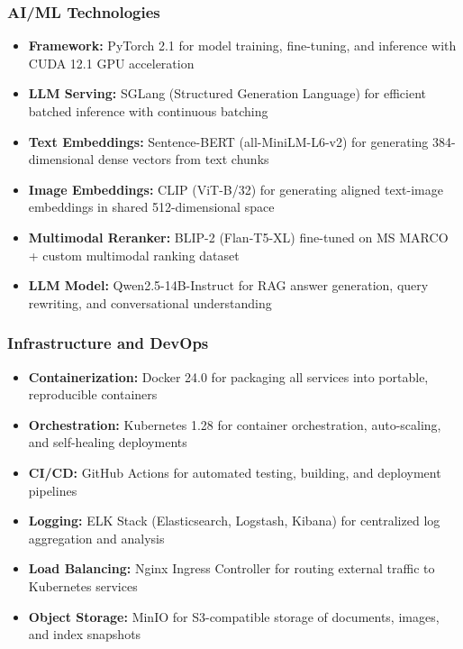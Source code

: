 \subsubsection{AI/ML Technologies}
\begin{itemize}
    \item \textbf{Framework:} PyTorch 2.1 for model training, fine-tuning, and inference with CUDA 12.1 GPU acceleration
    \item \textbf{LLM Serving:} SGLang (Structured Generation Language) for efficient batched inference with continuous batching
    \item \textbf{Text Embeddings:} Sentence-BERT (all-MiniLM-L6-v2) for generating 384-dimensional dense vectors from text chunks
    \item \textbf{Image Embeddings:} CLIP (ViT-B/32) for generating aligned text-image embeddings in shared 512-dimensional space
    \item \textbf{Multimodal Reranker:} BLIP-2 (Flan-T5-XL) fine-tuned on MS MARCO + custom multimodal ranking dataset
    \item \textbf{LLM Model:} Qwen2.5-14B-Instruct for RAG answer generation, query rewriting, and conversational understanding
\end{itemize}

\subsubsection{Infrastructure and DevOps}
\begin{itemize}
    \item \textbf{Containerization:} Docker 24.0 for packaging all services into portable, reproducible containers
    \item \textbf{Orchestration:} Kubernetes 1.28 for container orchestration, auto-scaling, and self-healing deployments
    \item \textbf{CI/CD:} GitHub Actions for automated testing, building, and deployment pipelines
    \item \textbf{Logging:} ELK Stack (Elasticsearch, Logstash, Kibana) for centralized log aggregation and analysis
    \item \textbf{Load Balancing:} Nginx Ingress Controller for routing external traffic to Kubernetes services
    \item \textbf{Object Storage:} MinIO for S3-compatible storage of documents, images, and index snapshots
\end{itemize}

